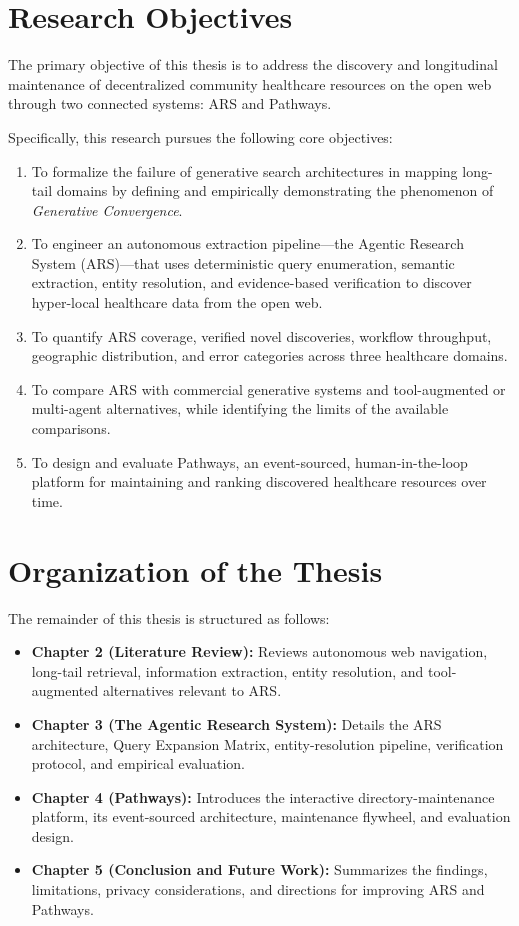 \documentclass[12pt,oneside]{report}
\begin{document}
\section{Research Objectives}
The primary objective of this thesis is to address the discovery and longitudinal maintenance of decentralized community healthcare resources on the open web through two connected systems: ARS and Pathways.

Specifically, this research pursues the following core objectives:
\begin{enumerate}
    \item To formalize the failure of generative search architectures in mapping long-tail domains by defining and empirically demonstrating the phenomenon of \textit{Generative Convergence}.
    \item To engineer an autonomous extraction pipeline—the Agentic Research System (ARS)—that uses deterministic query enumeration, semantic extraction, entity resolution, and evidence-based verification to discover hyper-local healthcare data from the open web.
    \item To quantify ARS coverage, verified novel discoveries, workflow throughput, geographic distribution, and error categories across three healthcare domains.
    \item To compare ARS with commercial generative systems and tool-augmented or multi-agent alternatives, while identifying the limits of the available comparisons.
    \item To design and evaluate Pathways, an event-sourced, human-in-the-loop platform for maintaining and ranking discovered healthcare resources over time.
\end{enumerate}

\section{Organization of the Thesis}
The remainder of this thesis is structured as follows:
\begin{itemize}
    \item \textbf{Chapter 2 (Literature Review):} Reviews autonomous web navigation, long-tail retrieval, information extraction, entity resolution, and tool-augmented alternatives relevant to ARS.
    \item \textbf{Chapter 3 (The Agentic Research System):} Details the ARS architecture, Query Expansion Matrix, entity-resolution pipeline, verification protocol, and empirical evaluation.
    \item \textbf{Chapter 4 (Pathways):} Introduces the interactive directory-maintenance platform, its event-sourced architecture, maintenance flywheel, and evaluation design.
    \item \textbf{Chapter 5 (Conclusion and Future Work):} Summarizes the findings, limitations, privacy considerations, and directions for improving ARS and Pathways.
\end{itemize}
\end{document}
